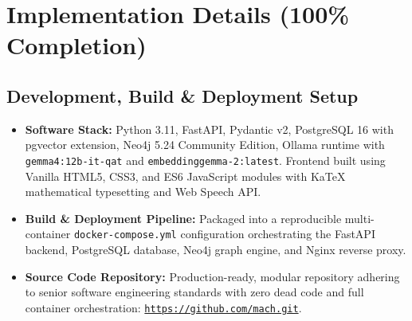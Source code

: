 \documentclass[11pt, a4paper]{article}
\begin{document}
\section{Implementation Details (100\% Completion)}

\subsection{Development, Build \& Deployment Setup}
\begin{itemize}[noitemsep, topsep=2pt]
    \item \textbf{Software Stack:} Python 3.11, FastAPI, Pydantic v2, PostgreSQL 16 with pgvector extension, Neo4j 5.24 Community Edition, Ollama runtime with \texttt{gemma4:12b-it-qat} and \texttt{embeddinggemma-2:latest}. Frontend built using Vanilla HTML5, CSS3, and ES6 JavaScript modules with KaTeX mathematical typesetting and Web Speech API.
    \item \textbf{Build \& Deployment Pipeline:} Packaged into a reproducible multi-container \texttt{docker-compose.yml} configuration orchestrating the FastAPI backend, PostgreSQL database, Neo4j graph engine, and Nginx reverse proxy.
    \item \textbf{Source Code Repository:} Production-ready, modular repository adhering to senior software engineering standards with zero dead code and full container orchestration: \href{https://github.com/saicharan45264/Campus-Knowledge-Engine.git}{\texttt{https://github.com/mach.git}}.
\end{itemize}
\end{document}
